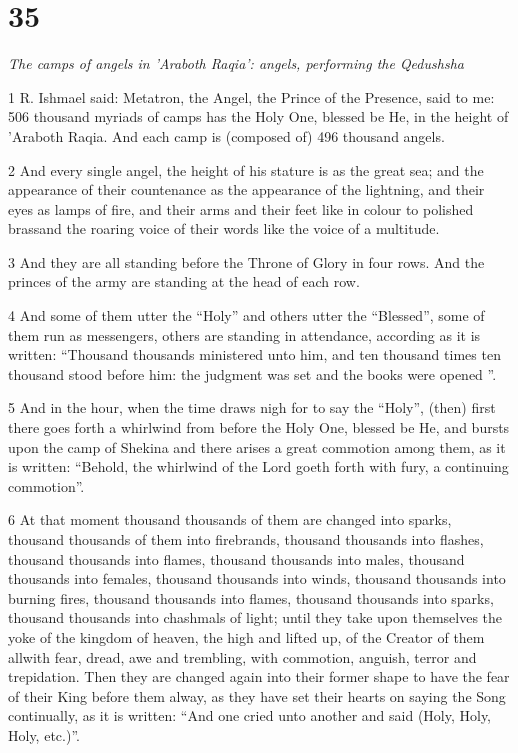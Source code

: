 \chapter{35}

\par \textit{The camps of angels in 'Araboth Raqia': angels, performing the Qedushsha}

\par 1 R. Ishmael said: Metatron, the Angel, the Prince of the Presence, said to me: 506 thousand myriads of camps has the Holy One, blessed be He, in the height of 'Araboth Raqia. And each camp is (composed of) 496 thousand angels. 

\par 2 And every single angel, the height of his stature is as the great sea; and the appearance of their countenance as the appearance of the lightning, and their eyes as lamps of fire, and their arms and their feet like in colour to polished brassand the roaring voice of their words like the voice of a multitude. 

\par 3 And they are all standing before the Throne of Glory in four rows. And the princes of the army are standing at the head of each row. 

\par 4 And some of them utter the “Holy” and others utter the “Blessed”, some of them run as messengers, others are standing in attendance, according as it is written: “Thousand thousands ministered unto him, and ten thousand times ten thousand stood before him: the judgment was set and the books were opened ”. 

\par 5 And in the hour, when the time draws nigh for to say the “Holy”, (then) first there goes forth a whirlwind from before the Holy One, blessed be He, and bursts upon the camp of Shekina and there arises a great commotion among them, as it is written: “Behold, the whirlwind of the Lord goeth forth with fury, a continuing commotion”. 

\par 6 At that moment thousand thousands of them are changed into sparks, thousand thousands of them into firebrands, thousand thousands into flashes, thousand thousands into flames, thousand thousands into males, thousand thousands into females, thousand thousands into winds, thousand thousands into burning fires, thousand thousands into flames, thousand thousands into sparks, thousand thousands into chashmals of light; until they take upon themselves the yoke of the kingdom of heaven, the high and lifted up, of the Creator of them allwith fear, dread, awe and trembling, with commotion, anguish, terror and trepidation. Then they are changed again into their former shape to have the fear of their King before them alway, as they have set their hearts on saying the Song continually, as it is written: “And one cried unto another and said (Holy, Holy, Holy, etc.)”. 


